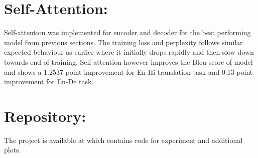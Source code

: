 \documentclass[11pt,a4paper]{article}
\begin{document}


\section{Self-Attention:}
Self-attention was implemented for encoder and decoder for the best performing model from previous sections. The training loss and perplexity follows similar expected behaviour as earlier where it initially drops rapidly and then slow down towards end of training. Self-attention however improves the Bleu score of model and shows a 1.2537 point improvement for En-Hi translation task and 0.13 point improvement for En-De task.

\section*{Repository:}
The project is available at \cite{GitHub} which contains code for experiment and additional plots.



\end{document}
